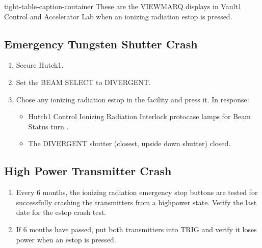 \documentclass[letterpaper,10pt,english]{sphinxmanual}
\begin{document}
\begin{sphinxuseclass}{tight-table-caption-container}
\sphinxAtStartPar
{} These are the VIEWMARQ displays in Vault\sphinxhyphen{}1 Control and Accelerator Lab when an ionizing radiation e\sphinxhyphen{}stop is pressed.

\end{sphinxuseclass}

\subsection{Emergency Tungsten Shutter Crash}
\label{\detokenize{testing_documentation/e-stop_testing:emergency-tungsten-shutter-crash}}\begin{enumerate}
%
\item {} 
\sphinxAtStartPar
Secure Hutch\sphinxhyphen{}1.

\item {} 
\sphinxAtStartPar
Set the BEAM SELECT to DIVERGENT.

\item {} 
\sphinxAtStartPar
Chose any ionizing radiation e\sphinxhyphen{}stop in the facility and press it. In response:
\begin{itemize}
\item {} 
\sphinxAtStartPar
Hutch\sphinxhyphen{}1 Control Ionizing Radiation Interlock protocase lamps for Beam Status turn .

\item {} 
\sphinxAtStartPar
The DIVERGENT shutter (closest, upside down shutter) closed.

\end{itemize}

\end{enumerate}


\subsection{High Power Transmitter Crash}
\label{\detokenize{testing_documentation/e-stop_testing:high-power-transmitter-crash}}\begin{enumerate}
%
\item {} 
\sphinxAtStartPar
Every 6 months, the ionizing radiation emergency stop buttons are tested for successfully crashing the transmitters from a high\sphinxhyphen{}power state. Verify the last date for the e\sphinxhyphen{}stop crash test.

\item {} 
\sphinxAtStartPar
If 6 months have passed, put both transmitters into TRIG and verify it loses power when an e\sphinxhyphen{}stop is pressed.

\end{enumerate}
\end{document}
